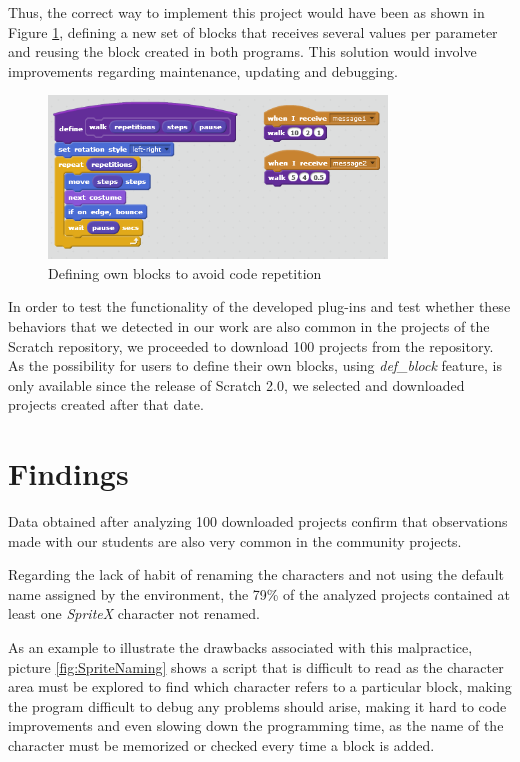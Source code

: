 \documentclass[conference]{format/IEEEtran}
\begin{document}
Thus, the correct way to implement this project would have been as shown in Figure \ref{fig:CodeRepetition2}, defining a new set of blocks that receives several values per parameter and reusing the block created in both programs. This solution would involve improvements regarding maintenance, updating and debugging.

\begin{figure}
  \centering
    \includegraphics[width=9cm]{img/CodeRepetition2.png}
  \caption{Defining own blocks to avoid code repetition}
  \label{fig:CodeRepetition2}
\end{figure}


In order to test the functionality of the developed plug-ins and test whether these behaviors that we detected in our work are also common in the projects of the Scratch repository, we proceeded to download 100 projects from the repository. As the possibility for users to define their own blocks, using \textit{def\_block} feature, is only available since the release of Scratch 2.0, we selected and downloaded projects created after that date.


\section{Findings}
\label{sec:findings}

Data obtained after analyzing 100 downloaded projects confirm that observations made with our students are also very common in the community projects.

Regarding the lack of habit of renaming the characters and not using the default name assigned by the environment, the 79\% of the analyzed projects contained at least one \textit{SpriteX} character not renamed.

As an example to illustrate the drawbacks associated with this malpractice, picture \ref{fig:SpriteNaming} shows a script that is difficult to read as the character area must be explored to find which character refers to a particular block, making the program difficult to debug any problems should arise, making it hard to code improvements and even slowing down the programming time, as the name of the character must be memorized or checked every time a block is added. 
\end{document}
